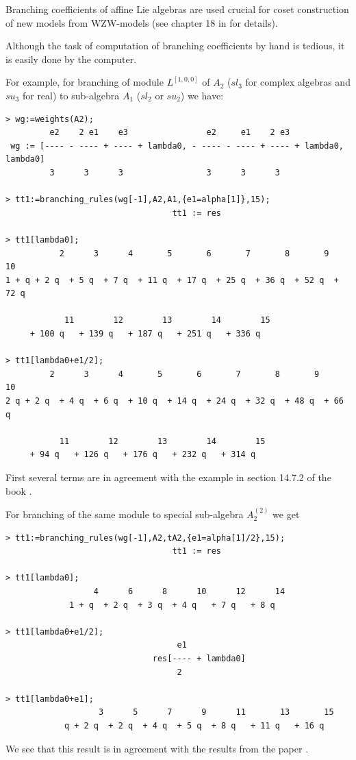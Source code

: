 \documentclass[a4paper,12pt]{article}
\theoremstyle{definition} \newtheorem{Def}{Definition}
\begin{document}
Branching coefficients of affine Lie algebras are used
crucial for coset construction of new models from WZW-models (see
chapter 18 in \cite{difrancesco1997cft} for details). 

Although the task of computation of branching coefficients by hand is
tedious, it is easily done by the computer.

For example, for branching of module $L^{[1,0,0]}$ of $A_2$ ($sl_3$
for complex algebras and $su_3$ for real) to sub-algebra $A_1$ ($sl_2$
or $su_2$) we have:
\begin{verbatim}
> wg:=weights(A2);
         e2    2 e1    e3                e2     e1    2 e3
 wg := [---- - ---- + ---- + lambda0, - ---- - ---- + ---- + lambda0, lambda0]
         3      3      3                 3      3      3

> tt1:=branching_rules(wg[-1],A2,A1,{e1=alpha[1]},15);
                                  tt1 := res

> tt1[lambda0];
           2      3      4       5       6       7       8       9       10
1 + q + 2 q  + 5 q  + 7 q  + 11 q  + 17 q  + 25 q  + 36 q  + 52 q  + 72 q

            11        12        13        14        15
     + 100 q   + 139 q   + 187 q   + 251 q   + 336 q  

> tt1[lambda0+e1/2];
         2      3      4       5       6       7       8       9       10
2 q + 2 q  + 4 q  + 6 q  + 10 q  + 14 q  + 24 q  + 32 q  + 48 q  + 66 q

           11        12        13        14        15
     + 94 q   + 126 q   + 176 q   + 232 q   + 314 q  
\end{verbatim}
First several terms are in agreement with the example in section
14.7.2 of the book \cite{difrancesco1997cft}.

For branching of the same module to special sub-algebra $A_2^{(2)}$ we
get
\begin{verbatim}
> tt1:=branching_rules(wg[-1],A2,tA2,{e1=alpha[1]/2},15);
                                  tt1 := res

> tt1[lambda0];
                  4      6      8      10      12      14
             1 + q  + 2 q  + 3 q  + 4 q   + 7 q   + 8 q

> tt1[lambda0+e1/2];
                                   e1
                              res[---- + lambda0]
                                   2

> tt1[lambda0+e1];
                   3      5      7      9      11       13       15
            q + 2 q  + 2 q  + 4 q  + 5 q  + 8 q   + 11 q   + 16 q
\end{verbatim}
We see that this result is in agreement with the results from the paper \cite{ilyin812pbc}.
\end{document}
